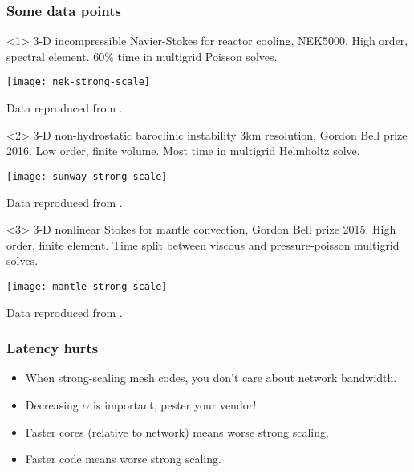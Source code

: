 \documentclass[presentation]{beamer}
\begin{document}
\begin{frame}
  \frametitle{Some data points}

  \begin{onlyenv}<1>
    3-D incompressible Navier-Stokes for reactor cooling, NEK5000.
    High order, spectral element.  60\% time in multigrid Poisson solves.

    \begin{center}
      \texttt{[image: nek-strong-scale]}

      Data reproduced from \textcite{Fischer:2015}.
    \end{center}
  \end{onlyenv}

  \begin{onlyenv}<2>
    3-D non-hydrostatic baroclinic instability 3km resolution, Gordon Bell prize
    2016.  Low order, finite volume. Most time in multigrid Helmholtz solve.
    \begin{center}
      \texttt{[image: sunway-strong-scale]}

      Data reproduced from \textcite{Yang:2016}.
    \end{center}
  \end{onlyenv}

  \begin{onlyenv}<3>
    3-D nonlinear Stokes for mantle convection, Gordon Bell prize
    2015.  High order, finite element.  Time split between viscous
    and pressure-poisson multigrid solves.

    \begin{center}
      \texttt{[image: mantle-strong-scale]}

      Data reproduced from \textcite{Rudi:2015}.
    \end{center}    
  \end{onlyenv}
\end{frame}

\begin{frame}
  \frametitle{Latency hurts}

  \begin{itemize}
  \item When strong-scaling mesh codes, you don't care about network
    bandwidth.
  \item Decreasing $\alpha$ is important, pester your vendor!
  \item Faster cores (relative to network) means worse strong scaling.
  \item Faster code means worse strong scaling.
  \end{itemize}
\end{frame}
\end{document}
